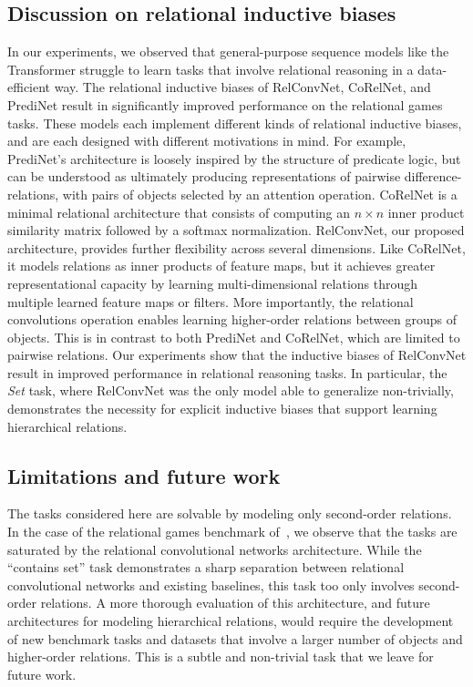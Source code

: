 \subsection*{Discussion on relational inductive biases}
In our experiments, we observed that general-purpose sequence models like the Transformer struggle to learn tasks that involve relational reasoning in a data-efficient way. The relational inductive biases of RelConvNet, CoRelNet, and PrediNet result in significantly improved performance on the relational games tasks. These models each implement different kinds of relational inductive biases, and are each designed with different motivations in mind. For example, PrediNet's architecture is loosely inspired by the structure of predicate logic, but can be understood as ultimately producing representations of pairwise difference-relations, with pairs of objects selected by an attention operation. CoRelNet is a minimal relational architecture that consists of computing an $n \times n$ inner product similarity matrix followed by a softmax normalization. RelConvNet, our proposed architecture, provides further flexibility across several dimensions. Like CoRelNet, it models relations as inner products of feature maps, but it achieves greater representational capacity by learning multi-dimensional relations through multiple learned feature maps or filters. More importantly, the relational convolutions operation enables learning higher-order relations between groups of objects. This is in contrast to both PrediNet and CoRelNet, which are limited to pairwise relations. Our experiments show that the inductive biases of RelConvNet result in improved performance in relational reasoning tasks. In particular, the \textit{Set} task, where RelConvNet was the only model able to generalize non-trivially, demonstrates the necessity for explicit inductive biases that support learning hierarchical relations.

\subsection*{Limitations and future work}
The tasks considered here are solvable by modeling only second-order relations. In the case of the relational games benchmark of~\citet{shanahanExplicitlyRelationalNeural}, we observe that the tasks are saturated by the relational convolutional networks architecture. While the ``contains set'' task demonstrates a sharp separation between relational convolutional networks and existing baselines, this task too only involves second-order relations.
A more thorough evaluation of this architecture, and future architectures for modeling hierarchical relations, would require the development of new benchmark tasks and datasets that involve a larger number of objects and higher-order relations. This is a subtle and non-trivial task that we leave for future work.

